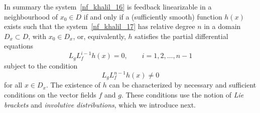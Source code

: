 \documentclass[12pt,a4paper,oneside]{book}
\begin{document}
\begin{onehalfspace}
In summary the system~\eqref{nf_khalil_16} is feedback linearizable in a 
neighbourhood of $x_0\in D$ if and only if a (sufficiently smooth) function 
$h(x)$ exists such that the system~\eqref{nf_khalil_17} has relative degree $n$ 
in a domain $D_x\subset D$, with $x_0\in D_x$, or, equivalently, $h$ satisfies 
the partial differential equations
\begin{equation}\label{nf_khalil_18}
	L_gL_f^{i-1}h(x) = 0,\qquad i=1,2,\dots,n-1
\end{equation} 
subject to the condition
\begin{equation}\label{nf_khalil_19}
	L_gL_f^{n-1}h(x) \ne 0
\end{equation} 
for all $x\in D_x$. The existence of $h$ can be characterized by necessary and 
sufficient conditions on the vector fields $f$ and $g$. These conditions use 
the notion of \textit{Lie brackets} and \textit{involutive distributions}, 
which we introduce next.


\end{onehalfspace}
\end{document}

